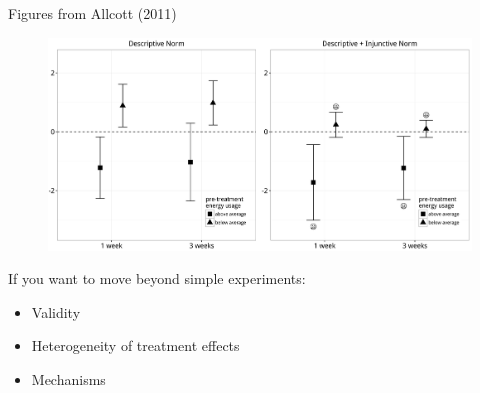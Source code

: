 \documentclass[aspectratio=169]{beamer}
\begin{document}
\begin{frame}

\begin{figure}
  \centering
\end{figure}

\vfill
\tiny{Figures from Allcott (2011)}

\end{frame}
\begin{frame}

\begin{figure}
  \centering
  \includegraphics[width = \textwidth]{figures/schultz_constructive_2007_23panel}
\end{figure}

\end{frame}
\begin{frame}

If you want to move beyond simple experiments:
\begin{itemize}
\item Validity
\item Heterogeneity of treatment effects
\item Mechanisms
\end{itemize}

\end{frame}
\end{document}

